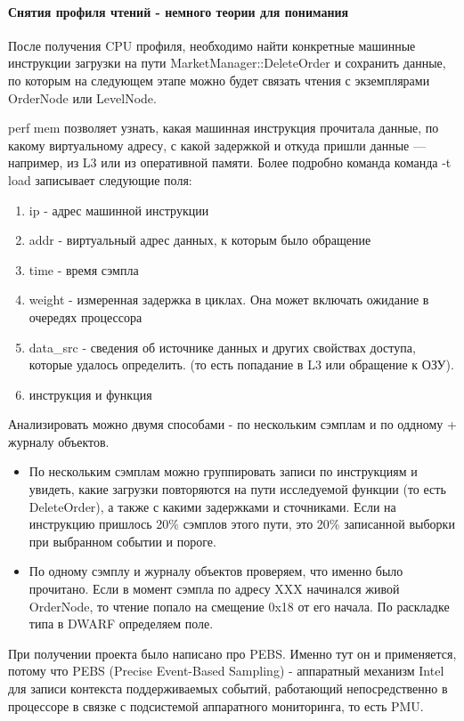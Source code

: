 \documentclass[a4paper,12pt]{article}
\begin{document}
\paragraph{Снятия профиля чтений - немного теории для понимания}
После получения CPU профиля, необходимо найти конкретные машинные инструкции загрузки 
на пути MarketManager::DeleteOrder и сохранить данные, по которым на следующем этапе 
можно будет связать чтения с экземплярами OrderNode или LevelNode.

perf mem позволяет узнать, какая машинная инструкция прочитала данные, по какому 
виртуальному адресу, с какой задержкой и откуда пришли данные — например, из L3 или из 
оперативной памяти. Более подробно команда команда -t load записывает следующие
поля:
\begin{enumerate}
    \item ip - адрес машинной инструкции
    \item addr - виртуальный адрес данных, к которым было обращение
    \item time - время сэмпла
    \item weight - измеренная задержка в циклах. Она может включать ожидание в
          очередях процессора
    \item data\_src - сведения об источнике данных и других свойствах доступа,
        которые удалось определить. (то есть попадание в L3 или обращение к
        ОЗУ).
    \item инструкция и функция
\end{enumerate}

Анализировать можно двумя способами - по нескольким сэмплам и по оддному +
журналу объектов. 

\begin{itemize}
    \item По нескольким сэмплам можно группировать записи по инструкциям и
        увидеть, какие загрузки повторяются на пути исследуемой функции (то есть
        DeleteOrder), а также с какими задержками и сточниками. Если на инструкцию пришлось 
        20\% сэмплов этого пути, это 20\% записанной выборки при выбранном событии и пороге.
    \item По одному сэмплу и журналу объектов проверяем, что именно было прочитано. Если в 
        момент сэмпла по адресу XXX начинался живой OrderNode, то чтение попало на смещение
        0x18 от его начала. По раскладке типа в DWARF определяем поле. 
\end{itemize}

При получении проекта было написано про PEBS. Именно тут он и применяется,
потому что PEBS (Precise Event-Based Sampling) - аппаратный механизм Intel для
записи контекста поддерживаемых событий, работающий непосредственно в процессоре
в связке с подсистемой аппаратного мониторинга, то есть PMU.
\end{document}
